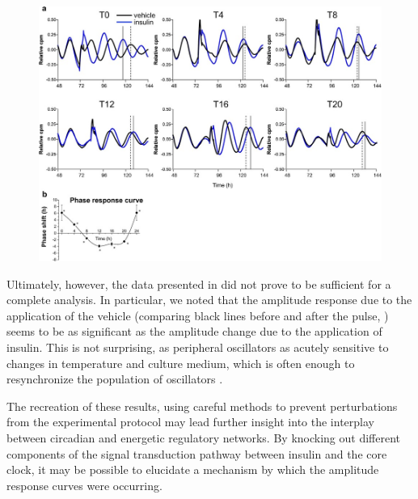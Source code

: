 \begin{figure}[tbp]
  \centering
\includegraphics[width=\textwidth]{chap7/figures/yamajuku_arc.jpg}
  \label{fig:yamajuku}
\end{figure}

Ultimately, however, the data presented in \cite{Yamajuku2012} did not prove to be sufficient for a complete analysis.
In particular, we noted that the amplitude response due to the application of the vehicle (comparing black lines before and after the pulse, ) seems to be as significant as the amplitude change due to the application of insulin.
This is not surprising, as peripheral oscillators as acutely sensitive to changes in temperature and culture medium, which is often enough to resynchronize the population of oscillators \cite{Izumo2006}.

The recreation of these results, using careful methods to prevent perturbations from the experimental protocol may lead further insight into the interplay between circadian and energetic regulatory networks.
By knocking out different components of the signal transduction pathway between insulin and the core clock, it may be possible to elucidate a mechanism by which the amplitude response curves were occurring.

